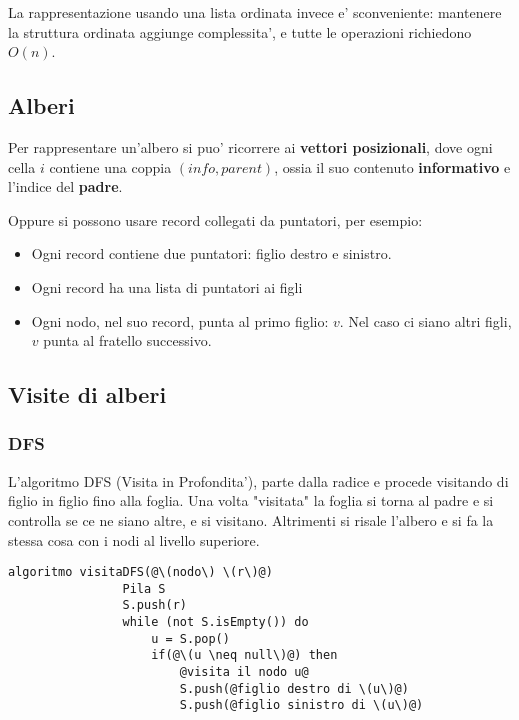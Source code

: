        La rappresentazione usando una lista ordinata invece e' sconveniente: mantenere la struttura ordinata
        aggiunge complessita', e tutte le operazioni richiedono \(O(n)\).
    
    \subsection{Alberi}
        Per rappresentare un'albero si puo' ricorrere ai \textbf{vettori posizionali}, dove ogni cella \(i\) contiene
        una coppia \((info, parent)\), ossia il suo contenuto \textbf{informativo} e l'indice del \textbf{padre}.

        Oppure si possono usare record collegati da puntatori, per esempio:
        \begin{itemize}
            \item Ogni record contiene due puntatori: figlio destro e sinistro. 
            \item Ogni record ha una lista di puntatori ai figli
            \item Ogni nodo, nel suo record, punta al primo figlio: \(v\). Nel caso ci siano altri figli, \(v\) punta al fratello successivo.
        \end{itemize}

    \subsection{Visite di alberi}
        \subsubsection{DFS}
        L'algoritmo DFS (Visita in Profondita'), parte dalla radice e procede visitando di figlio in figlio fino alla foglia.
        Una volta "visitata" la foglia si torna al padre e si controlla se ce ne siano altre, e si visitano. 
        Altrimenti si risale l'albero e si fa la stessa cosa con i nodi al livello superiore.
        
        \begin{lstlisting}[escapechar=@]
            algoritmo visitaDFS(@\(nodo\) \(r\)@)
                Pila S
                S.push(r)
                while (not S.isEmpty()) do
                    u = S.pop()
                    if(@\(u \neq null\)@) then
                        @visita il nodo u@
                        S.push(@figlio destro di \(u\)@)
                        S.push(@figlio sinistro di \(u\)@)
        \end{lstlisting}
        
